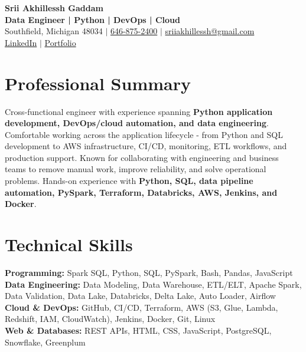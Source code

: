 \documentclass[letterpaper,10pt]{article}
\begin{document}
\fontsize{9.35pt}{10.45pt}\selectfont

\begin{center}
    {\LARGE \textbf{Srii Akhillessh Gaddam}} \\[-1pt]
    \textbf{Data Engineer | Python | DevOps | Cloud} \\[2pt]
    Southfield, Michigan 48034 $|$
    \href{tel:6468752400}{646-875-2400} $|$
    \href{mailto:sriiakhillessh@gmail.com}{sriiakhillessh@gmail.com} \\[1pt]
    \href{https://www.linkedin.com/in/srii-akhiilessh-gaddam-b48668191/}{LinkedIn} $|$
    \href{https://sriiakhillesshg.github.io/portfolio/}{Portfolio}
\end{center}
\vspace{-8pt}

\section{Professional Summary}
\small{Cross-functional engineer with experience spanning \textbf{Python application development, DevOps/cloud automation, and data engineering}. Comfortable working across the application lifecycle - from Python and SQL development to AWS infrastructure, CI/CD, monitoring, ETL workflows, and production support. Known for collaborating with engineering and business teams to remove manual work, improve reliability, and solve operational problems. Hands-on experience with \textbf{Python, SQL, data pipeline automation, PySpark, Terraform, Databricks, AWS, Jenkins, and Docker}.}

\section{Technical Skills}
\small{
\textbf{Programming:} Spark SQL, Python, SQL, PySpark, Bash, Pandas, JavaScript \\
\textbf{Data Engineering:} Data Modeling, Data Warehouse, ETL/ELT, Apache Spark, Data Validation, Data Lake, Databricks, Delta Lake, Auto Loader, Airflow \\
\textbf{Cloud \& DevOps:} GitHub, CI/CD, Terraform, AWS (S3, Glue, Lambda, Redshift, IAM, CloudWatch), Jenkins, Docker, Git, Linux \\
\textbf{Web \& Databases:} REST APIs, HTML, CSS, JavaScript, PostgreSQL, Snowflake, Greenplum
}
\end{document}
